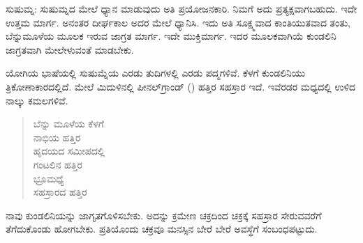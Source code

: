 ಸುಷುಮ್ನ: ಸುಷುಮ್ನದ ಮೇಲೆ ಧ್ಯಾನ ಮಾಡುವುದು ಅತಿ ಪ್ರಯೋಜನಕಾರಿ. ನಿಮಗೆ ಅದು ಪ್ರತ್ಯಕ್ಷವಾಗಬಹುದು. ಇದೇ ಉತ್ತಮ ಮಾರ್ಗ. ಅನಂತರ ದೀರ್ಘಕಾಲ ಅದರ ಮೇಲೆ ಧ್ಯಾನಿಸಿ. ಇದು ಅತಿ ಸೂಕ್ಷ್ಮವಾದ ಕಾಂತಿಯುತವಾದ ತಂತು, ಬೆನ್ನುಮೂಳೆಯ ಮೂಲಕ ಇರುವ ಜಾಗ್ರತ ಮಾರ್ಗ. ಇದೇ ಮುಕ್ತಿಮಾರ್ಗ. ಇದರ ಮೂಲಕವಾಗಿಯೆ ಕುಂಡಲಿನಿ ಜಾಗ್ರತವಾಗಿ ಮೇಲೇಳುವಂತೆ ಮಾಡಬೇಕು.

ಯೋಗಿಯ ಭಾಷೆಯಲ್ಲಿ ಸುಷುಮ್ನೆಯ ಎರಡು ತುದಿಗಳಲ್ಲಿ ಎರಡು ಪದ್ಮಗಳಿವೆ. ಕೆಳಗೆ ಕುಂಡಲಿನಿಯು ತ್ರಿಕೋಣಾಕಾರದಲ್ಲಿದೆ. ಮೇಲೆ ಮಿದುಳಿನಲ್ಲಿ ಪೀನಲ್‌ಗ್ರಾಂಡ್ () ಹತ್ತಿರ ಸಹಸ್ರಾರ ಇದೆ. ಇವೆರಡರ ಮಧ್ಯದಲ್ಲಿ ಉಳಿದ ನಾಲ್ಕು ಕಮಲಗಳಿವೆ.

\begin{verse}
ಬೆನ್ನು ಮೂಳೆಯ ಕೆಳಗೆ\\ನಾಭಿಯ ಹತ್ತಿರ\\ಹೃದಯದ ಸಮೀಪದಲ್ಲಿ\\ಗಂಟಲಿನ ಹತ್ತಿರ\\ಭ್ರೂಮಧ್ಯೆ\\ಸಹಸ್ರಾರದ ಹತ್ತಿರ
\end{verse}

ನಾವು ಕುಂಡಲಿನಿಯನ್ನು ಜಾಗೃತಗೊಳಿಸಬೇಕು. ಅದನ್ನು ಕ್ರಮೇಣ ಚಕ್ರದಿಂದ ಚಕ್ರಕ್ಕೆ ಸಹಸ್ರಾರ ಸೇರುವವರೆಗೆ ತೆಗೆದುಕೊಂಡು ಹೋಗಬೇಕು. ಪ್ರತಿಯೊಂದು ಚಕ್ರವೂ ಮನಸ್ಸಿನ ಬೇರೆ ಬೇರೆ ಅವಸ್ಥೆಗೆ ಸಂಬಂಧಪಟ್ಟುದು.

